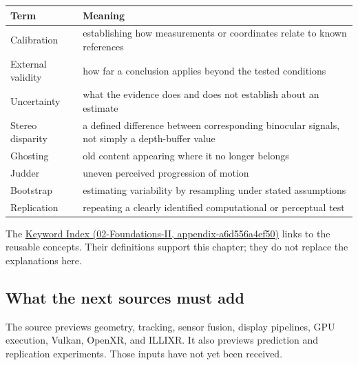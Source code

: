{\def\LTcaptype{none} %
\begin{longtable}[]{@{}
  >{\raggedright\arraybackslash}p{}
  >{\raggedright\arraybackslash}p{}@{}}
\toprule\noalign{}
\begin{minipage}[b]{\linewidth}\raggedright
Term
\end{minipage} & \begin{minipage}[b]{\linewidth}\raggedright
Meaning
\end{minipage} \\
\midrule\noalign{}
\endhead
\bottomrule\noalign{}
\endlastfoot
Calibration & establishing how measurements or coordinates relate to known references \\
External validity & how far a conclusion applies beyond the tested conditions \\
Uncertainty & what the evidence does and does not establish about an estimate \\
Stereo disparity & a defined difference between corresponding binocular signals, not simply a depth-buffer value \\
Ghosting & old content appearing where it no longer belongs \\
Judder & uneven perceived progression of motion \\
Bootstrap & estimating variability by resampling under stated assumptions \\
Replication & repeating a clearly identified computational or perceptual test \\
\end{longtable}
}

The \href{../02-Foundations-II/main.pdf\#nameddest=appendix-a6d556a4ef50}{Keyword Index (02-Foundations-II, appendix-a6d556a4ef50)} links to the reusable concepts. Their definitions support this chapter; they do not replace the explanations here.

\subsection{What the next sources must add}\label{04-visual-computing-ii-ch043-what-the-next-sources-must-add}

The source previews geometry, tracking, sensor fusion, display pipelines, GPU execution, Vulkan, OpenXR, and ILLIXR. It also previews prediction and replication experiments. Those inputs have not yet been received.

